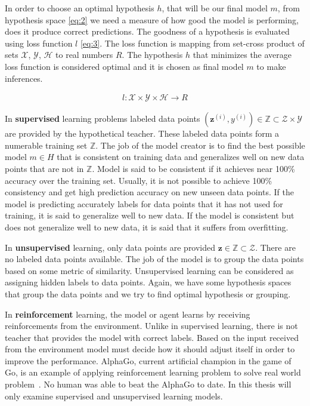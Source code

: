 \documentclass[english, 12pt, a4paper, elec, utf8, online]{aaltothesis}
\begin{document}
In order to choose an optimal hypothesis $h$, that will be our final model $m$, from hypothesis space \ref{eq:2} we need a measure of how good the model is performing, does it produce correct predictions. The goodness of a hypothesis is evaluated using loss function $l$ \ref{eq:3}. The loss function is mapping from set-cross product of sets $\mathcal{X}$, $\mathcal{Y}$, $\mathcal{H}$ to real numbers $R$. The hypothesis $h$ that minimizes the average loss function is considered optimal and it is chosen as final model $m$ to make inferences.  

\begin{align}\label{eq:3}
l:\mathcal{X} \times \mathcal{Y} \times \mathcal{H} \rightarrow R  
\end{align}

In \textbf{supervised} learning problems labeled data points $(\mathbf{z}^{(i)},y^{(i)}) \in \mathbb{Z} \subset \mathcal{Z} \times \mathcal{Y}$ are provided by the hypothetical teacher. These labeled data points form a numerable training set $\mathbb{Z}$. The job of the model creator is to find the best possible model $m \in H $ that is consistent on training data and generalizes well on new data points that are not in $\mathbb{Z}$. Model is said to be consistent if it achieves near 100\% accuracy over the training set. Usually, it is not possible to achieve 100\% consistency and get high prediction accuracy on new unseen data points. If the model is predicting accurately labels for data points that it has not used for training, it is said to generalize well to new data. If the model is consistent but does not generalize well to new data, it is said that it suffers from overfitting.

In \textbf{unsupervised} learning, only data points are provided $\mathbf{z} \in \mathbb{Z} \subset \mathcal{Z}$. There are no labeled data points available. The job of the model is to group the data points based on some metric of similarity. Unsupervised learning can be considered as assigning hidden labels to data points. Again, we have some hypothesis spaces that group the data points and we try to find optimal hypothesis or grouping.

In \textbf{reinforcement} learning, the model or agent learns by receiving reinforcements from the environment. Unlike in supervised learning, there is not teacher that provides the model with correct labels. Based on the input received from the environment model must decide how it should adjust itself in order to improve the performance. AlphaGo, current artificial champion in the game of Go, is an example of applying reinforcement learning problem to solve real world problem~\cite{silver2017mastering}. No human was able to beat the AlphaGo to date. In this thesis will only examine supervised and unsupervised learning models.     
\end{document}
